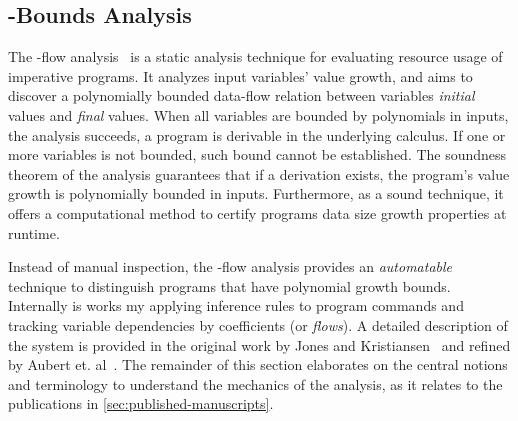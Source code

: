 \subsection{\mwp-Bounds Analysis}\label{subsec:mwp}

The \mwp-flow analysis~\cite{jones2009} is a static analysis technique for evaluating resource usage of imperative programs.
It analyzes input variables' value growth, and aims to discover a polynomially bounded data-flow relation between variables \emph{initial} values and \emph{final} values. 
When all variables are bounded by polynomials in inputs, the analysis succeeds, \ie a program is derivable in the underlying calculus.
If one or more variables is not bounded, such bound cannot be established.
The soundness theorem of the analysis guarantees that if a derivation exists, the program's value growth is polynomially bounded in inputs. Furthermore, as a sound technique, it offers a computational method to certify programs data size growth properties at runtime.



Instead of manual inspection, the \mwp-flow analysis provides an \emph{automatable} technique to distinguish programs that have polynomial growth bounds. 
Internally is works my applying inference rules to program commands and tracking variable dependencies by coefficients (or \emph{flows}).
A detailed description of the system is provided in the original work by Jones and Kristiansen~\cite{jones2009} and refined by Aubert et. al~\cite{aubert2022b}. The remainder of this section elaborates on the central notions and terminology to understand the mechanics of the analysis, as it relates to the publications in \autoref{sec:published-manuscripts}.




